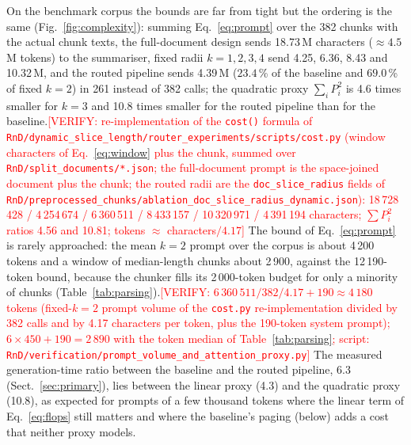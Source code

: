 \documentclass[pdflatex,sn-mathphys-num]{sn-jnl}
\newcommand{\todo}[1]{\textcolor{red}{#1}}
\newcommand{\verify}[1]{\todo{[VERIFY: #1]}}
\theoremstyle{thmstyleone}%
\theoremstyle{thmstylethree}%
\begin{document}
On the benchmark corpus the bounds are far from tight but the ordering is the same (Fig.~\ref{fig:complexity}): summing Eq.~\eqref{eq:prompt} over the 382 chunks with the actual chunk texts, the full-document design sends 18.73\,M characters ($\approx 4.5$\,M tokens) to the summariser, fixed radii $k=1,2,3,4$ send 4.25, 6.36, 8.43 and 10.32\,M, and the routed pipeline sends 4.39\,M ($23.4$\,\% of the baseline and $69.0$\,\% of fixed $k=2$) in 261 instead of 382 calls; the quadratic proxy $\sum_i P_i^2$ is 4.6 times smaller for $k=3$ and 10.8 times smaller for the routed pipeline than for the baseline.\verify{re-implementation of the \texttt{cost()} formula of \texttt{RnD/dynamic\_slice\_length/router\_experiments/scripts/cost.py} (window characters of Eq.~\eqref{eq:window} plus the chunk, summed over \texttt{RnD/split\_documents/*.json}; the full-document prompt is the space-joined document plus the chunk; the routed radii are the \texttt{doc\_slice\_radius} fields of \texttt{RnD/preprocessed\_chunks/ablation\_doc\_slice\_radius\_dynamic.json}): 18\,728\,428 / 4\,254\,674 / 6\,360\,511 / 8\,433\,157 / 10\,320\,971 / 4\,391\,194 characters; $\sum P_i^2$ ratios 4.56 and 10.81; tokens $\approx$ characters$/4.17$} The bound of Eq.~\eqref{eq:prompt} is rarely approached: the mean $k=2$ prompt over the corpus is about 4\,200 tokens and a window of median-length chunks about 2\,900, against the 12\,190-token bound, because the chunker fills its 2\,000-token budget for only a minority of chunks (Table~\ref{tab:parsing}).\verify{$6\,360\,511/382/4.17+190\approx 4\,180$ tokens (fixed-$k=2$ prompt volume of the \texttt{cost.py} re-implementation divided by 382 calls and by 4.17 characters per token, plus the 190-token system prompt); $6\times450+190=2\,890$ with the token median of Table~\ref{tab:parsing}; script: \texttt{RnD/verification/prompt\_volume\_and\_attention\_proxy.py}} The measured generation-time ratio between the baseline and the routed pipeline, 6.3 (Sect.~\ref{sec:primary}), lies between the linear proxy (4.3) and the quadratic proxy (10.8), as expected for prompts of a few thousand tokens where the linear term of Eq.~\eqref{eq:flops} still matters and where the baseline's paging (below) adds a cost that neither proxy models.
\end{document}
